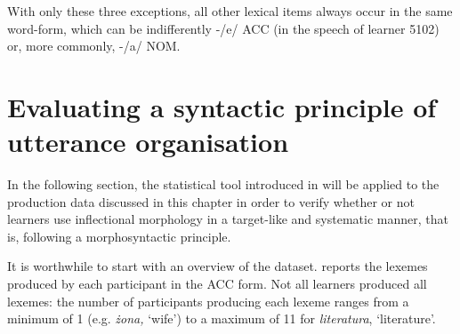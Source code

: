 With only these three exceptions, all other lexical items always occur in the same word-form, which can be indifferently -/e/ ACC (in the speech of learner 5102) or, more commonly, -/a/ NOM. 

\section{Evaluating a syntactic principle of utterance organisation}\label{sec:07:3}

In the following section, the statistical tool introduced in  will be applied to the production data discussed in this chapter in order to verify whether or not learners use inflectional morphology in a target-like and systematic manner, that is, following a morphosyntactic principle.

It is worthwhile to start with an overview of the dataset.  reports the lexemes produced by each participant in the ACC form. Not all learners produced all lexemes: the number of participants producing each lexeme ranges from a minimum of 1 (e.g. \textit{żona,} ‘wife’) to a maximum of 11 for \textit{literatura}, ‘literature’. 

